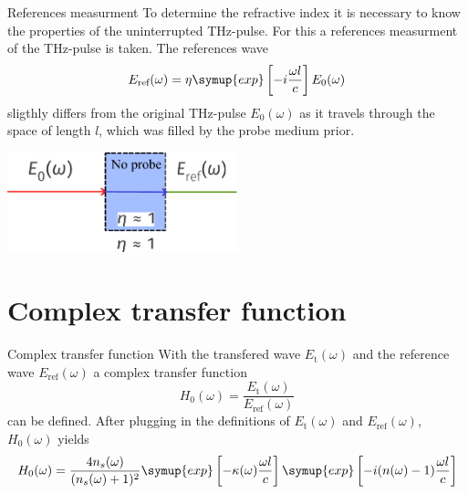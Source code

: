 \documentclass[aspectratio=1610, 9pt]{beamer}
\begin{document}
\begin{frame}{References measurment}
  To determine the refractive index it is necessary to know the properties of the uninterrupted THz-pulse.
  For this a references measurment of the THz-pulse is taken.
  The references wave 
  \begin{equation}
  E_\text{ref}(\omega) = \eta \symup{exp}\left[ -i \frac{\omega l }{c}\right] E_0(\omega)  
  \end{equation}
  sligthly differs from the original THz-pulse $E_0(\omega)$ as it travels through the space of length $l$, which was filled by the probe medium prior.
  \begin{center}
  \includegraphics[width=0.5\textwidth]{images/reference.pdf}
  \end{center}
\end{frame}

\section{Complex transfer function}
\begin{frame}{Complex transfer function}
  With the transfered wave $E_\text{t}(\omega)$ and the reference wave $E_\text{ref}(\omega)$ a complex transfer function 
  \begin{equation}
    H_0(\omega) = \frac{E_\text{t}(\omega)}{E_\text{ref}(\omega)}
  \end{equation}
  can be defined.
  After plugging in the definitions of $E_\text{t}(\omega)$ and $E_\text{ref}(\omega)$, $H_0(\omega)$ yields
  \begin{equation}
    H_0 (\omega) = \frac{4 n_s(\omega)}{(n_s(\omega) +1)^2} \symup{exp}\left[-\kappa(\omega) \frac{\omega l }{c}\right] \symup{exp}\left[-i (n (\omega) - 1) \frac{\omega l}{c}\right]
  \end{equation}
  \end{frame}
\end{document}

